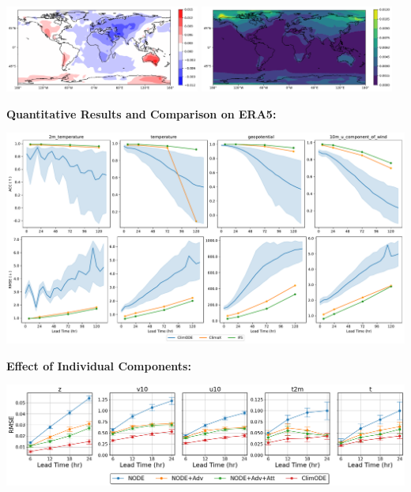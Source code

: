 \documentclass[landscape,a1paper,fontscale=0.424]{baposter}
\begin{document}
\begin{poster}
{\begin{minipage}[t]{0.50\textwidth}
\begin{center}
                \includegraphics[width=0.48\textwidth]{mu.pdf}
                \includegraphics[width=0.48\textwidth]{std.pdf}
            \end{center}

            \textbf{\color{blue}Quantitative Results and Comparison on ERA5:}
            \vspace{-0.5em}
            \begin{center}
                \includegraphics[width=\textwidth]{acc_rmse.pdf}
            \end{center}
        \end{minipage}\hfill
        \begin{minipage}[t]{0.50\textwidth}
            \textbf{\color{blue}Effect of Individual Components:}
            \vspace{-0.5em}
            \begin{center}
                \includegraphics[width=\textwidth]{ablation.png}
            \end{center}


\end{minipage}}
\end{poster}
\end{document}
